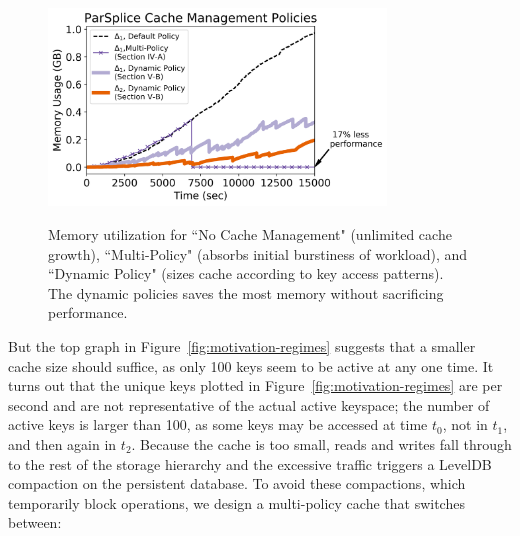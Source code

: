 \begin{figure}[t]
        \centering
        \includegraphics[width=0.8\textwidth]{./chapters/controlplane/parsplice/figures/memory-vs-time.png}\\
	\caption{Memory utilization for ``No Cache Management" (unlimited cache
growth), ``Multi-Policy" (absorbs initial burstiness of workload), and
``Dynamic Policy" (sizes cache according to key access patterns). The dynamic
policies saves the most memory without sacrificing performance.
\label{fig:memory-vs-time}}
\end{figure}%
 


%
%

But the top graph in Figure~\ref{fig:motivation-regimes} suggests that a
smaller cache size should suffice, as only 100 keys seem to be active at any
one time.  It turns out that the unique keys plotted in
Figure~\ref{fig:motivation-regimes} are per second and are not representative
of the actual active keyspace; the number of active keys is larger than 100, as
some keys may be accessed at time \(t_0\), not in \(t_1\), and then again in
\(t_2\). Because the cache is too small, reads and writes fall through to the
rest of the storage hierarchy and the excessive traffic triggers a LevelDB
compaction on the persistent database.  To avoid these compactions, which
temporarily block operations, we design a multi-policy cache that switches
between:

